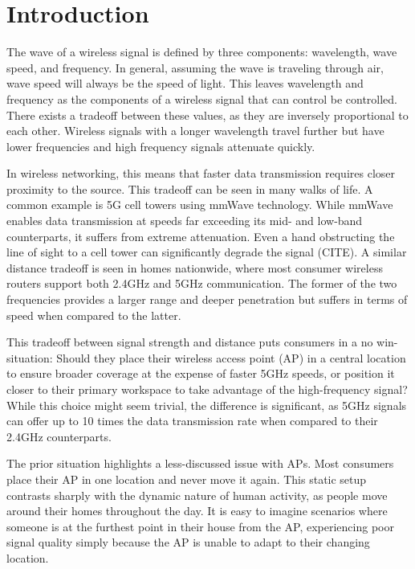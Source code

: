 \section{Introduction}
The wave of a wireless signal is defined by three components: wavelength, wave speed, and frequency. In general, assuming the wave is traveling through air, wave speed will always be the speed of light. This leaves wavelength and frequency as the components of a wireless signal that  can control be controlled.  There exists a tradeoff between these values, as they are inversely proportional to each other. Wireless signals with a longer wavelength travel further but have lower frequencies and high frequency signals attenuate quickly. 

In wireless networking, this means that faster data transmission requires closer proximity to the source. This tradeoff can be seen in many walks of life. A common example is 5G cell towers using mmWave technology. While mmWave enables data transmission at speeds far exceeding its mid- and low-band counterparts, it suffers from extreme attenuation. Even a hand obstructing the line of sight to a cell tower can significantly degrade the signal (CITE). A similar distance tradeoff is seen in homes nationwide, where most consumer wireless routers support both 2.4GHz and 5GHz communication. The former of the two frequencies provides a larger range and deeper penetration but suffers in terms of speed when compared to the latter. 

This tradeoff between signal strength and distance puts consumers in a no win-situation: Should they place their wireless access point (AP) in a central location to ensure broader coverage at the expense of faster 5GHz speeds, or position it closer to their primary workspace to take advantage of the high-frequency signal? While this choice might seem trivial, the difference is significant, as 5GHz signals can offer up to 10 times the data transmission rate when compared to their 2.4GHz counterparts. 

The prior situation highlights a less-discussed issue with APs. Most consumers place their AP in one location and never move it again. This static setup contrasts sharply with the dynamic nature of human activity, as people move around their homes throughout the day. It is easy to imagine scenarios where someone is at the furthest point in their house from the AP, experiencing poor signal quality simply because the AP is unable to adapt to their changing location.

